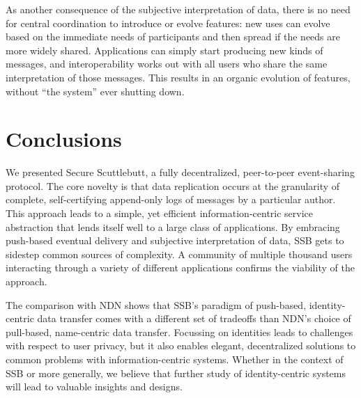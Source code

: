 \documentclass[9pt,sigconf]{acmart}
\begin{document}
As another consequence of the subjective interpretation of data, there
is no need for central coordination to introduce or evolve features:
new uses can evolve based on the immediate needs of participants and
then spread if the needs are more widely shared. Applications can
simply start producing new kinds of messages, and interoperability
works out with all users who share the same interpretation of those
messages.  This results in an organic evolution of features, without
``the system'' ever shutting down.



\section{Conclusions}

We presented Secure Scuttlebutt, a fully decentralized, peer-to-peer
event-sharing protocol. The core novelty is that data replication
occurs at the granularity of complete, self-certifying append-only
logs of messages by a particular author. This approach leads to a
simple, yet efficient information-centric service abstraction that
lends itself well to a large class of applications. By embracing
push-based eventual delivery and subjective interpretation of data,
SSB gets to sidestep common sources of complexity. A community of
multiple thousand users interacting through a variety of different
applications confirms the viability of the approach.

The comparison with NDN shows that SSB's paradigm of push-based,
identity-centric data transfer comes with a different set of tradeoffs
than NDN's choice of pull-based, name-centric data transfer. Focussing
on identities leads to challenges with respect to user privacy, but it
also enables elegant, decentralized solutions to common problems with
information-centric systems. Whether in the context of SSB or more
generally, we believe that further study of identity-centric systems
will lead to valuable insights and designs.




\end{document}
